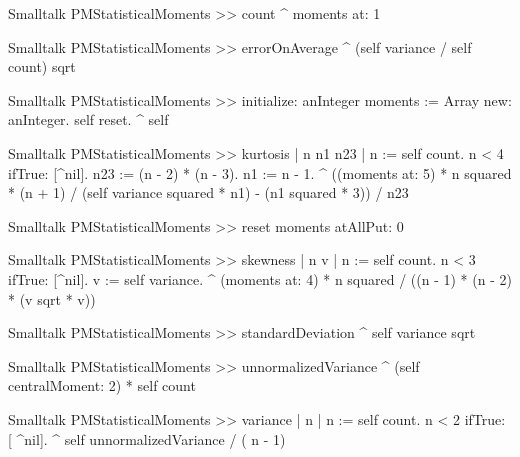 \begin{displaycode}{Smalltalk}
PMStatisticalMoments >> count
    ^ moments at: 1
\end{displaycode}

\begin{displaycode}{Smalltalk}
PMStatisticalMoments >> errorOnAverage
    ^ (self variance / self count) sqrt
\end{displaycode}

\begin{displaycode}{Smalltalk}
PMStatisticalMoments >> initialize: anInteger
    moments := Array new: anInteger.
    self reset.
    ^ self
\end{displaycode}

\begin{displaycode}{Smalltalk}
PMStatisticalMoments >> kurtosis
    | n n1 n23 |
    n := self count.
    n < 4 ifTrue: [^nil].
    n23 := (n - 2) * (n - 3).
    n1 := n - 1.
    ^ ((moments at: 5) * n squared * (n + 1) / (self variance squared 
                                                                * n1) 
        - (n1 squared * 3)) / n23
\end{displaycode}

\begin{displaycode}{Smalltalk}
PMStatisticalMoments >> reset
    moments atAllPut: 0
\end{displaycode}

\begin{displaycode}{Smalltalk}
PMStatisticalMoments >> skewness
    | n v |
    n := self count.
    n < 3 ifTrue: [^nil].
    v := self variance.
    ^ (moments at: 4) * n squared / ((n - 1) * (n - 2) * (v sqrt * v))
\end{displaycode}

\begin{displaycode}{Smalltalk}
PMStatisticalMoments >> standardDeviation
    ^ self variance sqrt
\end{displaycode}

\begin{displaycode}{Smalltalk}
PMStatisticalMoments >> unnormalizedVariance
    ^ (self centralMoment: 2) * self count
\end{displaycode}

\begin{displaycode}{Smalltalk}
PMStatisticalMoments >> variance
    | n |
    n := self count.
    n < 2
        ifTrue: [ ^nil].
    ^ self unnormalizedVariance / ( n - 1)
\end{displaycode}

